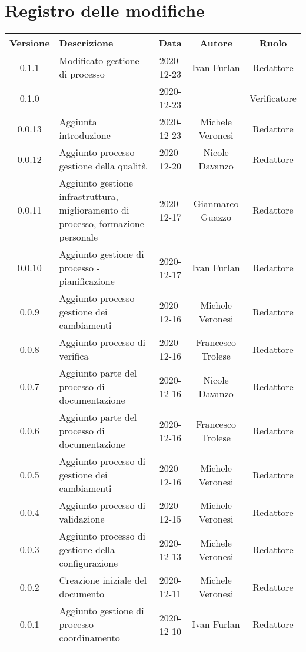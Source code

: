 \section*{Registro delle modifiche}

\begin{center}
	\begin{longtable}{|c|p{5cm}|c|c|c|}
	\hline
	\rowcolor{lighter-grayer}
	\textbf{Versione} & \textbf{Descrizione} & \textbf{Data} & \textbf{Autore} & \textbf{Ruolo} \\
	\hline
	\endfirsthead


	\hline
	0.1.1 & Modificato gestione di processo & 2020-12-23 & Ivan Furlan & Redattore \\
	0.1.0 &  & 2020-12-23 &  & Verificatore \\
	0.0.13 & Aggiunta introduzione & 2020-12-23 & Michele Veronesi & Redattore \\
	0.0.12 & Aggiunto processo gestione della qualità & 2020-12-20 & Nicole Davanzo & Redattore \\
	0.0.11 & Aggiunto gestione infrastruttura, miglioramento di processo, formazione personale & 2020-12-17 & Gianmarco Guazzo & Redattore \\
	0.0.10 & Aggiunto gestione di processo - pianificazione & 2020-12-17 & Ivan Furlan & Redattore \\
	0.0.9 & Aggiunto processo gestione dei cambiamenti & 2020-12-16 & Michele Veronesi & Redattore \\
	0.0.8 & Aggiunto processo di verifica & 2020-12-16 & Francesco Trolese & Redattore \\
	0.0.7 & Aggiunto parte del processo di documentazione & 2020-12-16 & Nicole Davanzo & Redattore \\
	0.0.6 & Aggiunto parte del processo di documentazione & 2020-12-16 & Francesco Trolese & Redattore \\
	0.0.5 & Aggiunto processo di gestione dei cambiamenti & 2020-12-16 & Michele Veronesi & Redattore \\
	0.0.4 & Aggiunto processo di validazione & 2020-12-15 & Michele Veronesi & Redattore \\
	0.0.3 & Aggiunto processo di gestione della configurazione & 2020-12-13 & Michele Veronesi & Redattore \\
	0.0.2 & Creazione iniziale del documento & 2020-12-11 & Michele Veronesi & Redattore \\
	0.0.1 & Aggiunto gestione di processo - coordinamento & 2020-12-10 & Ivan Furlan & Redattore \\

	\hline

	\end{longtable}
\end{center}